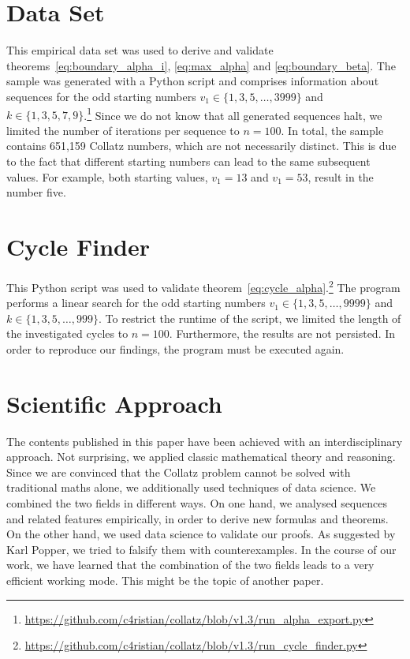 \documentclass{SciPress_2015}
\begin{document}
\section{Data Set}
\label{appx:data_set}
This empirical data set was used to derive and validate theorems~\ref{eq:boundary_alpha_i}, \ref{eq:max_alpha} and \ref{eq:boundary_beta}. The sample was generated with a Python script and comprises information about sequences for the odd starting numbers $v_1\in\{1,3,5,\ldots,3999\}$ and $k\in\{1,3,5,7,9\}$.\footnote{\url{https://github.com/c4ristian/collatz/blob/v1.3/run_alpha_export.py}} Since we do not know that all generated sequences halt, we limited the number of iterations per sequence to $n=100$. In total, the sample contains 651,159 Collatz numbers, which are not necessarily distinct. This is due to the fact that different starting numbers can lead to the same subsequent values. For example, both starting values, $v_1=13$ and $v_1=53$, result in the number five.

\section{Cycle Finder}
\label{appx:cycle_finder}
This Python script was used to validate theorem~\ref{eq:cycle_alpha}.\footnote{\url{https://github.com/c4ristian/collatz/blob/v1.3/run_cycle_finder.py}} The program performs a linear search for the odd starting numbers $v_1\in\{1,3,5,\ldots,9999\}$ and $k\in\{1,3,5,\ldots,999\}$. To restrict the runtime of the script, we limited the length of the investigated cycles to $n=100$. Furthermore, the results are not persisted. In order to reproduce our findings, the program must be executed again.

\section{Scientific Approach}
\label{appx:scientific_approach}
The contents published in this paper have been achieved with an interdisciplinary approach. Not surprising, we applied classic mathematical theory and reasoning. Since we are convinced that the Collatz problem cannot be solved with traditional maths alone, we additionally used techniques of data science. We combined the two fields in different ways. On one hand, we analysed sequences and related features empirically, in order to derive new formulas and theorems. On the other hand, we used data science to validate our proofs. As suggested by Karl Popper, we tried to falsify them with counterexamples. In the course of our work, we have learned that the combination of the two fields leads to a very efficient working mode. This might be the topic of another paper.
\end{document}
